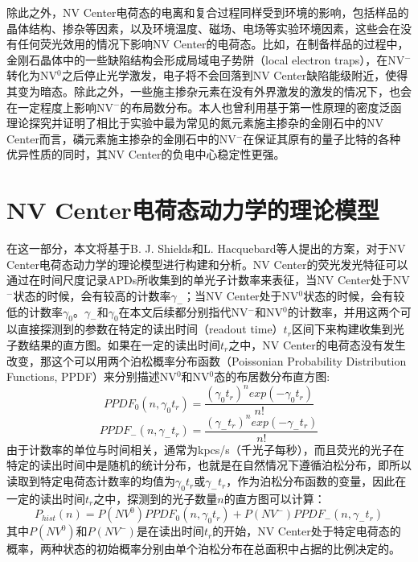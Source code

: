 \documentclass[type = bachelor]{whu-thesis}
\begin{document}
除此之外，NV Center电荷态的电离和复合过程同样受到环境的影响，包括样品的晶体结构、掺杂等因素，以及环境温度、磁场、电场等实验环境因素，这些会在没有任何荧光效用的情况下影响NV Center的电荷态。比如，在制备样品的过程中，金刚石晶体中的一些缺陷结构会形成局域电子势阱（local electron traps），在NV$^-$转化为NV$^0$之后停止光学激发，电子将不会回落到NV Center缺陷能级附近，使得其变为暗态\cite{bluvstein2019identifying}。除此之外，一些施主掺杂元素在没有外界激发的激发的情况下，也会在一定程度上影响NV$^-$的布局数分布\cite{doi2016pure}。本人也曾利用基于第一性原理的密度泛函理论探究并证明了相比于实验中最为常见的氮元素施主掺杂的金刚石中的NV Center而言，磷元素施主掺杂的金刚石中的NV$^-$在保证其原有的量子比特的各种优异性质的同时，其NV Center的负电中心稳定性更强\cite{zou2023influence}。

\section{NV Center电荷态动力学的理论模型}
在这一部分，本文将基于B. J. Shields和L. Hacquebard等人提出的方案，对于NV Center电荷态动力学的理论模型进行构建和分析\cite{shields2015efficient, hacquebard2018charge}。NV Center的荧光发光特征可以通过在时间尺度记录APDs所收集到的单光子计数率来表征，当NV Center处于NV$^-$状态的时候，会有较高的计数率$\gamma_-$；当NV Center处于NV$^0$状态的时候，会有较低的计数率$\gamma_0$。$\gamma_-$和$\gamma_0$在本文后续都分别指代NV$^-$和NV$^0$的计数率，并用这两个可以直接探测到的参数在特定的读出时间（readout time）$t_r$区间下来构建收集到光子数结果的直方图。如果在一定的读出时间$t_r$之中，NV Center的电荷态没有发生改变，那这个可以用两个泊松概率分布函数（Poissonian Probability Distribution Functions, PPDF）来分别描述NV$^0$和NV$^0$态的布居数分布直方图:
\begin{equation}
  PPDF_0(n, \gamma_0 t_r) = \frac{(\gamma_0 t_r)^n exp(-\gamma_0 t_r)}{n!}
  \label{equ: PPDF_0}
\end{equation}
\begin{equation}
  PPDF_-(n, \gamma_- t_r) = \frac{(\gamma_- t_r)^n exp(-\gamma_- t_r)}{n!}
  \label{equ: PPDF_1}
\end{equation}
由于计数率的单位与时间相关，通常为kpcs/s（千光子每秒），而且荧光的光子在特定的读出时间中是随机的统计分布，也就是在自然情况下遵循泊松分布，即所以读取到特定电荷态计数率的均值为$\gamma_0 t_r$或$\gamma_- t_r$，作为泊松分布函数的变量，因此在一定的读出时间$t_r$之中，探测到的光子数量$n$的直方图可以计算：
\begin{equation}
P_{hist}(n)=P(NV^0)PPDF_0(n, \gamma_0 t_r)+P(NV^-)PPDF_-(n, \gamma_- t_r)
\end{equation}
其中$P(NV^0)$和$P(NV^-)$是在读出时间$t_r$的开始，NV Center处于特定电荷态的概率，两种状态的初始概率分别由单个泊松分布在总面积中占据的比例决定的。
\end{document}
